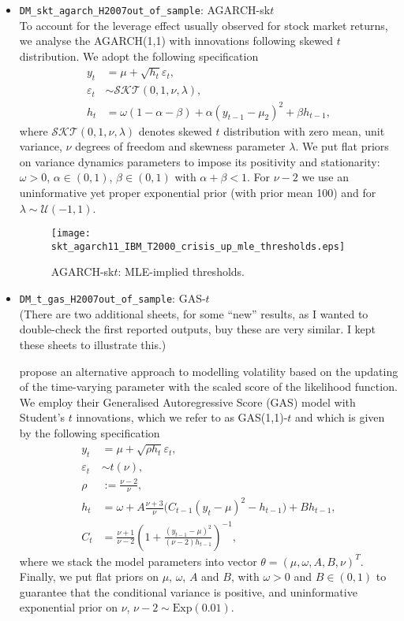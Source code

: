 \documentclass[a4paper,10pt]{article} %
\begin{document}
\begin{itemize}
\begin{itemize}
\item \texttt{DM\_skt\_agarch\_H2007out\_of\_sample}: AGARCH-sk$t$\\
To account for  the leverage effect usually observed for stock market returns, we analyse the AGARCH(1,1) with innovations following \citet{hansen_skt} skewed $t$ distribution.
We adopt the following specification 
\begin{align*}
y_{t}&=\mu+\sqrt{h_{t}}\varepsilon_{t},\\
\varepsilon_{t} & \sim \mathcal{SKT}(0,1,\nu,\lambda),\\
h_{t}&=\omega(1-\alpha-\beta) + \alpha (y_{t-1}-\mu_2)^{2} + \beta h_{t-1},
\end{align*}
where $\mathcal{SKT}(0,1,\nu,\lambda)$ denotes \citet{hansen_skt} skewed $t$ distribution with zero mean, unit variance, $\nu$ degrees of freedom and skewness parameter $\lambda$.
We put flat priors on variance dynamics parameters to impose its positivity and stationarity: $\omega>0$, $\alpha\in(0,1)$, $\beta\in(0,1)$ with $\alpha+\beta<1$. For  $\nu-2$ we use an uninformative yet proper exponential prior (with prior mean 100) and for $\lambda\sim\mathcal{U}(-1,1)$.

\begin{figure}[h]
\centering
\centering
\texttt{[image: skt\_agarch11\_IBM\_T2000\_crisis\_up\_mle\_thresholds.eps]} 
\caption{AGARCH-sk$t$: MLE-implied thresholds.}
\label{fig:agarch_thres}       
\end{figure}

\item \texttt{DM\_t\_gas\_H2007out\_of\_sample}: GAS-$t$\\
(There are two additional sheets, for some ``new'' results, as I wanted to double-check the first reported outputs, buy these are very similar. I kept these sheets to illustrate this.)

\citet{gas_paper} propose an alternative approach to modelling volatility based on the updating of the time-varying parameter with the scaled score of the likelihood function. We employ their  Generalised Autoregressive Score (GAS) model with Student's $t$ innovations, which we refer to as GAS(1,1)-$t$ and which is given by the following specification
\begin{align*}
y_{t} &= \mu + \sqrt{\rho h_{t}}\varepsilon_{t},\\
\varepsilon_{t}&\sim t(\nu),\\
\rho &:= \frac{\nu-2}{\nu},\\
h_{t} &=\omega + A \frac{\nu+3}{\nu}\Big(C_{t-1}(y_{t}-\mu)^{2}-h_{t-1}\Big) + B h_{t-1},\\
C_{t} &= \frac{\nu+1}{\nu-2}\left(1+\frac{(y_{t-1}-\mu)^2}{(\nu-2)h_{t-1}}\right)^{-1},
\end{align*}
where we stack the model parameters into vector $\theta=(\mu,\omega,A,B,\nu)^{T}$. Finally, we put flat priors on $\mu$, $\omega$, $A$ and $B$, with $\omega>0$ and $B\in(0,1)$ to guarantee that the conditional variance is positive, and uninformative exponential prior on $\nu$, $\nu-2\sim \mbox{Exp}(0.01)$.


\end{itemize}
\end{itemize}
\end{document}
